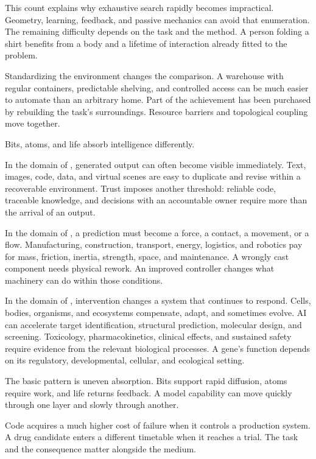 This count explains why exhaustive search rapidly becomes impractical. Geometry, learning, feedback, and passive mechanics can avoid that enumeration. The remaining difficulty depends on the task and the method. A person folding a shirt benefits from a body and a lifetime of interaction already fitted to the problem.

Standardizing the environment changes the comparison. A warehouse with regular containers, predictable shelving, and controlled access can be much easier to automate than an arbitrary home. Part of the achievement has been purchased by rebuilding the task's surroundings. Resource barriers and topological coupling move together.


Bits, atoms, and life absorb intelligence differently.

In the domain of , generated output can often become visible immediately. Text, images, code, data, and virtual scenes are easy to duplicate and revise within a recoverable environment. Trust imposes another threshold: reliable code, traceable knowledge, and decisions with an accountable owner require more than the arrival of an output.

In the domain of , a prediction must become a force, a contact, a movement, or a flow. Manufacturing, construction, transport, energy, logistics, and robotics pay for mass, friction, inertia, strength, space, and maintenance. A wrongly cast component needs physical rework. An improved controller changes what machinery can do within those conditions.

In the domain of , intervention changes a system that continues to respond. Cells, bodies, organisms, and ecosystems compensate, adapt, and sometimes evolve. AI can accelerate target identification, structural prediction, molecular design, and screening. Toxicology, pharmacokinetics, clinical effects, and sustained safety require evidence from the relevant biological processes. A gene's function depends on its regulatory, developmental, cellular, and ecological setting.

The basic pattern is uneven absorption. Bits support rapid diffusion, atoms require work, and life returns feedback. A model capability can move quickly through one layer and slowly through another.



Code acquires a much higher cost of failure when it controls a production system. A drug candidate enters a different timetable when it reaches a trial. The task and the consequence matter alongside the medium.

